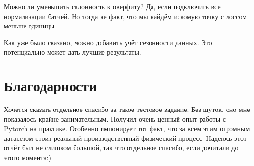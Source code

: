 \documentclass[12pt,a4paper]{report}
\begin{document}
Можно ли уменьшить склонность к оверфиту? Да, если подключить все нормализации батчей. Но тогда не факт, что мы найдём искомую точку с лоссом меньше единицы.

Как уже было сказано, можно добавить учёт сезонности данных. Это потенциально может дать лучшие результаты.

\section*{Благодарности}
Хочется сказать отдельное спасибо за такое тестовое задание. Без шуток, оно мне показалось крайне занимательным. Получил очень ценный опыт работы с Pytorch на практике. Особенно импонирует тот факт, что за всем этим огромным датасетом стоит реальный производственный физический процесс. Надеюсь этот отчёт был не слишком большой, так что отдельное спасибо, если дочитали до этого момента:)
\end{document}
